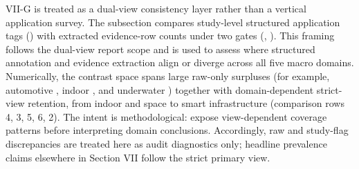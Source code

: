 {}\markdownRendererInterblockSeparator
{}\markdownRendererSectionBegin
{}\markdownRendererInterblockSeparator
{}VII-G is treated as a dual-view consistency layer rather than a vertical application survey. The subsection compares study-level structured application tags () with extracted evidence-row counts under two gates (, ). This framing follows the dual-view report scope and is used to assess where structured annotation and evidence extraction align or diverge across all five macro domains. Numerically, the contrast space spans large raw-only surpluses (for example, automotive , indoor , and underwater ) together with domain-dependent strict-view retention, from indoor  and space  to smart infrastructure  (comparison rows \markdownRendererHash{}4, \markdownRendererHash{}3, \markdownRendererHash{}5, \markdownRendererHash{}6, \markdownRendererHash{}2). The intent is methodological: expose view-dependent coverage patterns before interpreting domain conclusions. Accordingly, raw and study-flag discrepancies are treated here as audit diagnostics only; headline prevalence claims elsewhere in Section VII follow the strict primary view.\markdownRendererInterblockSeparator
